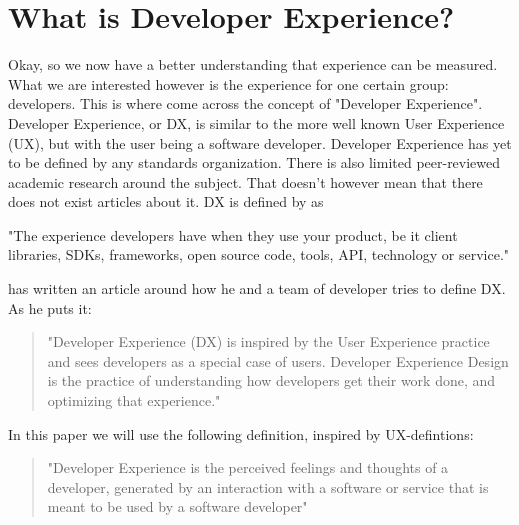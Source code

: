 \documentclass{cslthse-msc}
\begin{document}
    \section{What is Developer Experience?}
    Okay, so we now have a better understanding that experience can be measured. What we are interested however is the experience for one certain group: developers. This is where come across the concept of "Developer Experience". Developer Experience, or DX, is similar to the more well known User
    Experience (UX), but with the user being a software developer. Developer Experience has yet to be defined by any standards organization. There is also limited peer-reviewed academic research around the subject. That doesn't however mean that there does not exist articles about it. DX is
    defined by \citet{jarman} as
    \begin{displayquote}
        "The experience developers have when they use your product, be it
        client libraries, SDKs, frameworks, open source code, tools, API,
        technology or service."
    \end{displayquote}
    \citet{dhide} has written an article around how he and a team of developer tries to define DX. As he puts it:
    \begin{quote}
        "Developer Experience (DX) is inspired by the User Experience practice and sees developers as a special case of users. Developer Experience Design is the practice of understanding how developers get their work done, and optimizing that experience."
    \end{quote}
    In this paper we will use the following definition, inspired by UX-defintions:
    \begin{quote}
        "Developer Experience is the perceived feelings and thoughts of a developer, generated by an interaction with a software or service that is meant to be used by a software developer"
    \end{quote}
\end{document}
